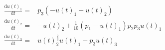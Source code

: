 \begin{align}
\frac{\mathrm{d} u\left( t \right)_{1}}{\mathrm{d}t} =& p_{3} \left(  - u\left( t \right)_{1} + u\left( t \right)_{2} \right) \\
\frac{\mathrm{d} u\left( t \right)_{2}}{\mathrm{d}t} =&  - u\left( t \right)_{2} + \frac{1}{10} \left( p_{1} - u\left( t \right)_{1} \right) p_{2} p_{3} u\left( t \right)_{1} \\
\frac{\mathrm{d} u\left( t \right)_{3}}{\mathrm{d}t} =& u\left( t \right)_{2}^{\frac{2}{3}} u\left( t \right)_{1} - p_{3} u\left( t \right)_{3}
\end{align}
